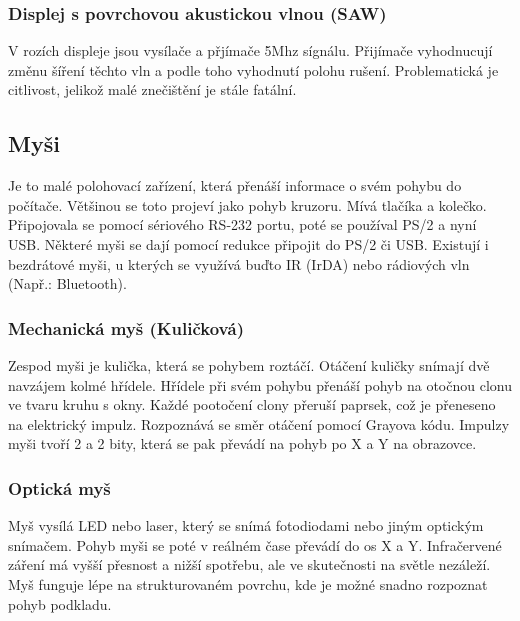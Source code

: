     \subsubsection{Displej s povrchovou akustickou vlnou (SAW)}
    V rozích displeje jsou vysílače a přjímače 5Mhz sígnálu.
    Přijímače vyhodnucují změnu šíření těchto vln a podle toho vyhodnutí polohu rušení.
    Problematická je citlivost, jelikož malé znečištění je stále fatální.
  \subsection{Myši}
    Je to malé polohovací zařízení, která přenáší informace o svém pohybu do počítače.
    Většinou se toto projeví jako pohyb kruzoru.
    Mívá tlačíka a kolečko.
    Připojovala se pomocí sériového RS-232 portu, poté se používal PS/2 a nyní USB.
    Některé myši se dají pomocí redukce připojit do PS/2 či USB.
    Existují i bezdrátové myši, u kterých se využívá buďto IR (IrDA) nebo rádiových vln (Např.: Bluetooth).
    \subsubsection{Mechanická myš (Kuličková)}
      Zespod myši je kulička, která se pohybem roztáčí.
      Otáčení kuličky snímají dvě navzájem kolmé hřídele.
      Hřídele při svém pohybu přenáší pohyb na otočnou clonu ve tvaru kruhu s okny.
      Každé pootočení clony přeruší paprsek, což je přeneseno na elektrický impulz.
      Rozpoznává se směr otáčení pomocí Grayova kódu.
      Impulzy myši tvoří 2 a 2 bity, která se pak převádí na pohyb po X a Y na obrazovce.
    \subsubsection{Optická myš}
      Myš vysílá LED nebo laser, který se snímá fotodiodami nebo jiným optickým snímačem.
      Pohyb myši se poté v reálném čase převádí do os X a Y.
      Infračervené záření má vyšší přesnost a nižší spotřebu, ale ve skutečnosti na světle nezáleží.
      Myš funguje lépe na strukturovaném povrchu, kde je možné snadno rozpoznat pohyb podkladu.